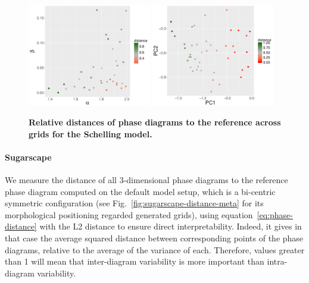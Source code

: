 \documentclass[Royal,sageh,times]{sagej}
\begin{document}
\begin{figure}
\centering
\includegraphics[width=0.48\textwidth]{figures/schelling-relativedistance_metaparams}
\includegraphics[width=0.48\textwidth]{figures/schelling-relativedistance_morphspace}
\caption{\textbf{Relative distances of phase diagrams to the reference across grids for the Schelling model.} \label{fig:schelling-distance-meta}}
\end{figure}



\paragraph{Sugarscape} We measure the distance of all 3-dimensional phase diagrams to the reference phase diagram computed on the default model setup, which is a bi-centric symmetric configuration (see Fig.~\ref{fig:sugarscape-distance-meta} for its morphological positioning regarded generated grids), using equation~\ref{eq:phase-distance} with the L2 distance to ensure direct interpretability.  Indeed, it gives in that case the average squared distance between corresponding points of the phase diagrams, relative to the average of the variance of each. Therefore, values greater than 1 will mean that inter-diagram variability is more important than intra-diagram variability.


\end{document}
